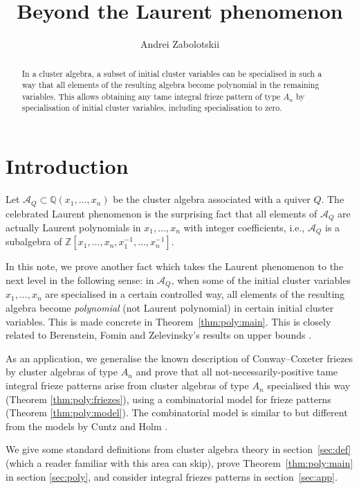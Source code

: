 \documentclass[12pt]{article}
\title{Beyond the Laurent phenomenon}
\author{Andrei Zabolotskii}
\date{}
\theoremstyle{definition}
\newcommand{\Z}{\mathbb{Z}}
\begin{document}
\maketitle

\begin{abstract}
In a cluster algebra, a subset of initial cluster variables can be specialised in such a way that all elements of the resulting algebra become polynomial in the remaining variables.
This allows obtaining any tame integral frieze pattern of type $A_n$ by specialisation of initial cluster variables, including specialisation to zero.
\end{abstract}

{\let\thefootnote\relax{}}


\section{Introduction}
Let $\mathcal{A}_Q\subset \mathbb{Q}(x_1,\ldots,x_n)$ be the cluster algebra associated with a quiver $Q$. The celebrated Laurent phenomenon \cite{CA1} is the surprising fact that all elements of $\mathcal{A}_Q$ are actually Laurent polynomials in $x_1,\ldots,x_n$ with integer coefficients, i.e., $\mathcal{A}_Q$ is a subalgebra of $\Z[x_1,\ldots,x_n,x_1^{-1},\ldots,x_n^{-1}]$.

In this note, we prove another fact which takes the Laurent phenomenon to the next level in the following sense: in $\mathcal{A}_Q$, when some of the initial cluster variables $x_1,\ldots,x_n$ are specialised in a certain controlled way, all elements of the resulting algebra become \emph{polynomial} (not Laurent polynomial) in certain initial cluster variables. This is made concrete in Theorem~\ref{thm:poly:main}. This is closely related to Berenstein, Fomin and Zelevinsky's results on upper bounds \cite{CA3}.

As an application, we generalise the known description of Conway--Coxeter friezes by cluster algebras of type $A_n$ and prove that all not-necessarily-positive tame integral frieze patterns arise from cluster algebras of type $A_n$ specialised this way (Theorem \ref{thm:poly:friezes}), using a combinatorial model for frieze patterns (Theorem \ref{thm:poly:model}). The combinatorial model is similar to but different from the models by Cuntz and Holm \cite{CuntzModel,CuntzHolmFriezes}.

We give some standard definitions from cluster algebra theory in section~\ref{sec:def} (which a reader familiar with this area can skip), prove Theorem~\ref{thm:poly:main} in section \ref{sec:poly}, and consider integral friezes patterns in section~\ref{sec:app}.
\end{document}

